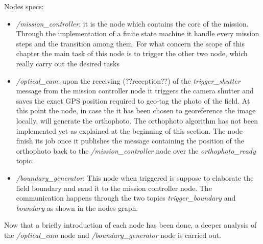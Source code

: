 Nodes specs:
\begin{itemize}
	\item \textit{/mission\_controller}: it is the node which contains the core of the mission. Through the implementation of a finite state machine it handle every mission steps and the transition among them. For what concern the scope of this chapter the main task of this node is to trigger the other two node, which really carry out the desired tasks
	\item \textit{/optical\_cam}: upon the receiving (??reception??) of the \textit{trigger\_shutter} message from the mission controller node it triggers the camera shutter and saves the exact GPS position required to geo-tag the photo of the field.
	At this point the node, in case the it has been chosen to georeference the image locally, will generate the orthophoto. The orthophoto algorithm has not been implemented yet as explained at the beginning of this section.
	The node finish its job once it publishes the message containing the position of the orthophoto back to the \textit{/mission\_controller} node over the \textit{orthophoto\_ready} topic. 
	\item \textit{/boundary\_generator}: This node when triggered is suppose to elaborate the field boundary and sand it to the mission controller node. The communication happens through the two topics \textit{trigger\_boundary} and \textit{boundary} as shown in the nodes graph.
\end{itemize}
Now that a briefly introduction of each node has been done, a deeper analysis of the \textit{/optical\_cam} node and \textit{/boundary\_generator} node is carried out.

